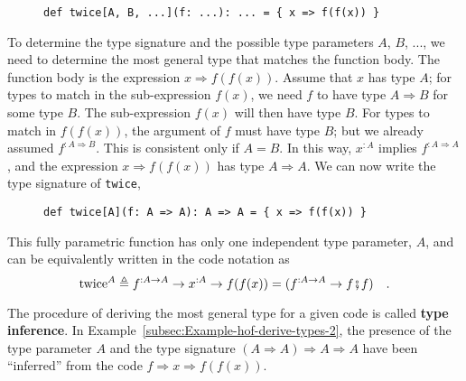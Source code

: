\begin{wrapfigure}{l}{0.525\columnwidth}%
\vspace{-0.75\baselineskip}
\begin{lstlisting}
def twice[A, B, ...](f: ...): ... = { x => f(f(x)) }
\end{lstlisting}
\vspace{-1\baselineskip}
\end{wrapfigure}%

\noindent To determine the type signature and the possible type parameters
$A$, $B$, ..., we need to determine the most general type that matches
the function body. The function body is the expression $x\Rightarrow f(f(x))$.
Assume that $x$ has type $A$; for types to match in the sub-expression
$f(x)$, we need $f$ to have type $A\Rightarrow B$ for some type
$B$. The sub-expression $f(x)$ will then have type $B$. For types
to match in $f(f(x))$, the argument of $f$ must have type $B$;
but we already assumed $f^{:A\Rightarrow B}$. This is consistent
only if $A=B$. In this way, $x^{:A}$ implies $f^{:A\Rightarrow A}$,
and the expression $x\Rightarrow f(f(x))$ has type $A\Rightarrow A$.
We can now write the type signature of \lstinline!twice!,

\begin{wrapfigure}{l}{0.51\columnwidth}%
\vspace{-0.75\baselineskip}
\begin{lstlisting}
def twice[A](f: A => A): A => A = { x => f(f(x)) }
\end{lstlisting}
\vspace{-0.95\baselineskip}
\end{wrapfigure}%

\noindent This fully parametric function has only one independent
type parameter, $A$, and can be equivalently written in the code
notation as 
\begin{equation}
\text{twice}^{A}\triangleq f^{:A\Rightarrow A}\Rightarrow x^{:A}\Rightarrow f(f(x))=(f^{:A\Rightarrow A}\Rightarrow f\bef f)\quad.\label{eq:hof-def-of-twice-in-math-notation}
\end{equation}

The procedure of deriving the most general type for a given code is
called \textbf{type inference}. In Example~\ref{subsec:Example-hof-derive-types-2},
the presence of the type parameter $A$ and the type signature $\left(A\Rightarrow A\right)\Rightarrow A\Rightarrow A$
have been ``inferred'' from the code $f\Rightarrow x\Rightarrow f(f(x))$.

